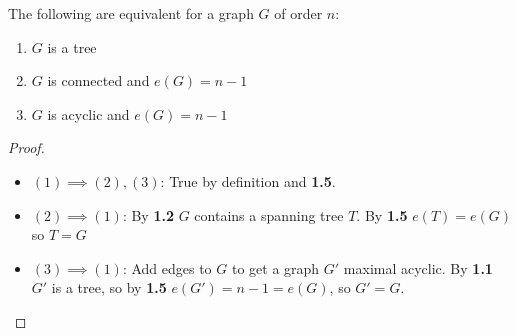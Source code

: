 \documentclass[10pt,a4paper]{article}
\begin{document}
\begin{corollary}
The following are equivalent for a graph $G$ of order $n$:
\begin{enumerate}
\item $G$ is a tree
\item $G$ is connected and $e(G) = n-1$
\item $G$ is acyclic and $e(G) = n-1$
\end{enumerate}
\end{corollary}
\begin{proof}\item
\begin{itemize}
\item{$(1) \implies (2),(3)$:} True by definition and \textbf{1.5}.
\item{$(2) \implies (1)$:} By \textbf{1.2} $G$ contains a spanning tree $T$. By \textbf{1.5} $e(T) = e(G)$ so $T=G$
\item{$(3) \implies (1)$:} Add edges to $G$ to get a graph $G'$ maximal acyclic. By \textbf{1.1} $G'$ is a tree, so by \textbf{1.5} $e(G') = n-1 = e(G)$, so $G' = G$.
\end{itemize}
\end{proof}
\end{document}
